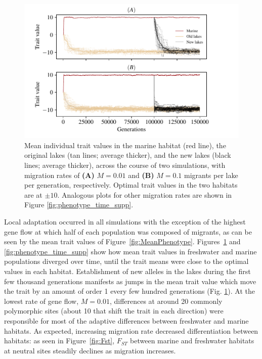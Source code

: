 \documentclass{article}
\begin{document}
\begin{figure}
    \begin{center}
        \includegraphics{Final_Plots/Pheno_Time.pdf}
          \caption{ 
        Mean individual trait values in the marine habitat (red line),
                the original lakes (tan lines; average thicker),
                and the new lakes (black lines; average thicker),
                across the course of two simulations, with migration rates of
                \textbf{(A)} $M=0.01$ and
                \textbf{(B)} $M=0.1$ 
                migrants per lake per generation, respectively.
                Optimal trait values in the two habitats are at $\pm 10$.
                    Analogous plots for other migration rates
                    are shown in Figure \ref{fig:phenotype_time_supp}.
        }
          \label{fig:phenotype_time}
    \end{center}
\end{figure}

Local adaptation occurred in all simulations with the exception of the highest gene flow at which half of each population was composed of migrants, 
as can be seen by the mean trait values of Figure~\ref{fig:MeanPhenotype}.
Figures~\ref{fig:phenotype_time} and \ref{fig:phenotype_time_supp} show how mean trait values in freshwater and marine populations diverged over time, until the trait means were close to the optimal values in each habitat. 
Establishment of new alleles in the lakes during the first few thousand generations manifests as jumps in the mean trait value which move the trait by an amount of order 1 every few hundred generations (Fig. \ref{fig:phenotype_time}).
At the lowest rate of gene flow, $M = 0.01$, differences at around 20 commonly polymorphic sites (about 10 that shift the trait in each direction) were responsible for most of the adaptive differences between freshwater and marine habitats. 
As expected, increasing migration rate decreased differentiation between habitats: as seen in Figure~\ref{fig:Fst}, $F_{ST}$ between marine and freshwater habitats at neutral sites steadily declines as migration increases. 
\end{document}
